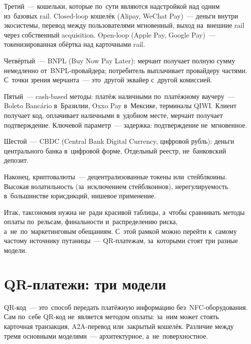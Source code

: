 Третий~--- кошельки, которые по~сути являются надстройкой над одним из~базовых
rail. Closed-loop кошелёк (Alipay, WeChat Pay)~--- деньги внутри экосистемы,
перевод между пользователями мгновенный, выход на~внешние rail через собственный
acquisition. Open-loop (Apple Pay, Google Pay)~--- токенизированная
обёртка над карточными rail.

Четвёртый~--- BNPL (Buy Now Pay Later): мерчант получает полную сумму немедленно
от~BNPL-провайдера; потребитель выплачивает провайдеру частями. С~точки
зрения мерчанта~--- это~другой эквайер с~другой комиссией.

Пятый~--- cash-based методы: платёж наличными по~платёжному ваучеру~--- Boleto
Bancário в~Бразилии, Oxxo Pay в~Мексике, терминалы QIWI. Клиент получает
код, оплачивает наличными в~удобном месте, мерчант получает подтверждение.
Ключевой параметр~--- задержка: подтверждение не~мгновенное.

Шестой~--- CBDC (Central Bank Digital Currency, цифровой рубль): деньги
центрального банка в~цифровой форме. Отдельный реестр, не~банковский
депозит.

Наконец, криптовалюты~--- децентрализованные токены или~стейблкоины. Высокая
волатильность (за~исключением стейблкоинов), нерегулируемость в~большинстве
юрисдикций, нишевое применение.



Итак, таксономия нужна не~ради красивой таблицы, а~чтобы сравнивать
методы оплаты по~рельсам, финальности и~распределению риска,
а~не~по~маркетинговым обещаниям. С~этой рамкой можно перейти
к~самому частому источнику путаницы~--- QR-платежам, за~которыми
стоят три разные модели.

\section{QR-платежи: три модели}
\label{sec:alt-qr}

QR-код~--- это~способ передать платёжную информацию без~NFC-оборудования.
Сам по~себе QR-код не~является методом оплаты: за~ним может стоять
карточная транзакция, A2A-перевод или~закрытый кошелёк. Различие между
тремя основными моделями~--- архитектурное, а~не~поверхностное.


